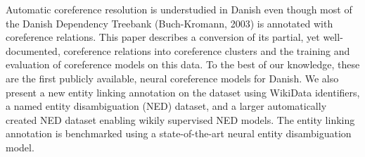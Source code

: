 Automatic coreference resolution is understudied in Danish even though most of the Danish Dependency Treebank (Buch-Kromann, 2003) is annotated with coreference relations. This paper describes a conversion of its partial, yet well-documented, coreference relations into coreference clusters and the training and evaluation of coreference models on this data. To the best of our knowledge, these are the first publicly available, neural coreference models for Danish. We also present a new entity linking annotation on the dataset using WikiData identifiers, a named entity disambiguation (NED) dataset, and a larger automatically created NED dataset enabling wikily supervised NED models. The entity linking annotation is benchmarked using a state-of-the-art neural entity disambiguation model.
